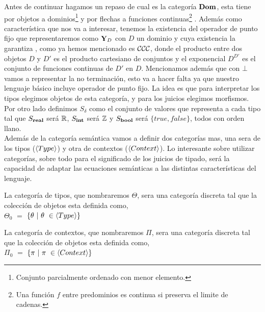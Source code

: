 Antes de continuar hagamos un repaso de cual es
la categor\'ia $\textbf{Dom}$, esta tiene por objetos a 
dominios\footnote{Conjunto parcialmente ordenado con menor elemento.}
y por flechas a
funciones continuas\footnote{Una funci\'on $f$ entre predominios es continua si preserva
el limite de cadenas.}
. Adem\'as como caracter\'istica que nos va a interesar, 
tenemos la existencia del operador de punto fijo que representaremos como $\textbf{Y}_D$
con $D$ un dominio y cuya existencia la garantiza \cite[P 2.5]{reynolds2009theories}, como
ya hemos mencionado es $\mathcal{CCC}$, donde el producto entre dos objetos $D$ y $D'$ 
es el producto cartesiano de conjuntos y el exponencial $D^{D'}$ es el conjunto 
de funciones continuas de $D'$ en $D$.
Mencionamos adem\'as que con $\bot$ vamos a representar la no terminaci\'on, esto
va a hacer falta ya que nuestro lenguaje b\'asico incluye operador de punto fijo.
La idea es que para interpretar los tipos elegimos 
objetos de esta categor\'ia, y para los juicios elegimos morfismos.\\

Por otro lado definimos $S_\delta$ como el conjunto de valores que representa a cada tipo
tal que $S_{\textbf{real}}$ ser\'a $\mathbb{R}$, $S_{\textbf{int}}$ ser\'a $\mathbb{Z}$ y $S_{\textbf{bool}}$ ser\'a $\{true,false\}$,
todos con orden llano.\\

Adem\'as de la categor\'ia sem\'antica vamos a definir dos categor\'ias mas,
una sera de los tipos ($\langle Type \rangle$) y
otra de contextos ($\langle Context \rangle$). Lo interesante sobre utilizar categor\'ias, sobre
todo para el significado de los juicios de tipado, ser\'a la capacidad de
adaptar las ecuaciones sem\'anticas a las distintas caracter\'isticas del lenguaje.

\begin{definition}\label{lambdaa:typescategory}
La categor\'ia de tipos, que nombraremos $\Theta$, sera una categor\'ia discreta tal que 
la colecci\'on de objetos esta definida como,\\

$\Theta_0$ $=$ $\{\theta \ | \ \theta \ \in \langle Type \rangle \}$

\end{definition}

\begin{definition}\label{lambdaa:contextcategory}
La categor\'ia de contextos, que nombraremos $\Pi$, sera una categor\'ia discreta tal que 
la colecci\'on de objetos esta definida como,\\

$\Pi_0$ $=$ $\{\pi \ | \ \pi \ \in \langle Context \rangle \}$

\end{definition}

